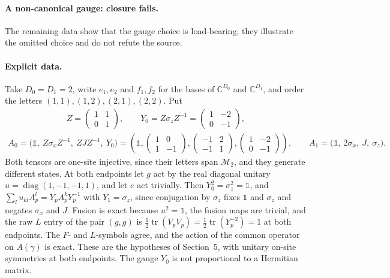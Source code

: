 \documentclass{article}
\begin{document}
\paragraph{A non-canonical gauge: closure fails.} The remaining data show
that the gauge choice is load-bearing; they illustrate the omitted choice
and do not refute the source.

\paragraph{Explicit data.} Take $D_0=D_1=2$, write $e_1,e_2$ and
$f_1,f_2$ for the bases of $\mathbb C^{D_0}$ and $\mathbb C^{D_1}$, and
order the letters $(1,1),(1,2),(2,1),(2,2)$. Put
\begin{align}
    Z=\begin{pmatrix}1&1\\0&1\end{pmatrix},\qquad
    Y_0=Z\sigma_zZ^{-1}=\begin{pmatrix}1&-2\\0&-1\end{pmatrix},
    \label{eq:glm23_parent_commutation_noncanonical_gauge}
\end{align}
\begin{align}
    A_0=\bigl(\mathbb 1,\ Z\sigma_xZ^{-1},\ ZJZ^{-1},\ Y_0\bigr)
    =\left(\mathbb 1,\begin{pmatrix}1&0\\1&-1\end{pmatrix},
    \begin{pmatrix}-1&2\\-1&1\end{pmatrix},
    \begin{pmatrix}1&-2\\0&-1\end{pmatrix}\right),\qquad
    A_1=\bigl(\mathbb 1,\ 2\sigma_x,\ J,\ \sigma_z\bigr).
    \label{eq:glm23_parent_commutation_noncanonical_tensors}
\end{align}
Both tensors are one-site injective, since their letters span
$\mathcal M_2$, and they generate different states. At both endpoints let
$g$ act by the real diagonal unitary $u=\operatorname{diag}(1,-1,-1,1)$,
and let $e$ act trivially. Then $Y_0^2=\sigma_z^2=\mathbb 1$, and
$\sum_lu_{kl}A_p^l=Y_pA_p^kY_p^{-1}$ with $Y_1=\sigma_z$, since
conjugation by $\sigma_z$ fixes $\mathbb 1$ and $\sigma_z$ and negates
$\sigma_x$ and $J$. Fusion is exact because $u^2=\mathbb 1$, the fusion
maps are trivial, and the raw $L$ entry of the pair $(g,g)$ is
$\tfrac12\operatorname{tr}(V_pV_p)=\tfrac12\operatorname{tr}(Y_p^{-2})=1$
at both endpoints. The $F$- and $L$-symbols agree, and the action of the
common operator on $A(\gamma)$ is exact. These are the hypotheses of
Section~5, with unitary on-site symmetries at both endpoints. The gauge
$Y_0$ is not proportional to a Hermitian matrix.
\end{document}
